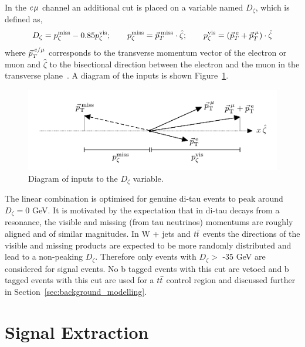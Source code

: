 In the $e_{}\mu_{}$ channel an additional cut is placed on a variable named $D_{\zeta}$, which is defined as,
\begin{equation}
D_\zeta = p_\zeta^\text{miss} - 0.85 p_\zeta^\text{vis};\qquad
p_\zeta^\text{miss} = \vec{p}_{T}^{\hspace{2pt}\text{miss}} \cdot \hat{\zeta};\qquad
p_\zeta^\text{vis} = (\vec{p}_{T}^{\hspace{2pt}e} + \vec{p}_{T}^{\hspace{2pt}\mu}) \cdot \hat{\zeta}
\label{eq:Dzeta_def}
\end{equation}
where $\vec{p}_{T}^{\hspace{2pt}e/\mu}$ corresponds to the transverse momentum vector of the electron or muon and $\hat{\zeta}$ to the bisectional direction between the electron and the muon in the transverse plane~\cite{CDFPzeta}.
A diagram of the inputs is shown Figure~\ref{fig:dzeta_diagram}.
\begin{figure}[!hbtp]
\centering
    \includegraphics[width=1.0\textwidth]{Figures/dzeta_diagram.pdf}
\caption{Diagram of inputs to the $D_\zeta$ variable.}
\label{fig:dzeta_diagram}
\end{figure}
The linear combination is optimised for genuine di-tau events to peak around $D_{\zeta} = 0$ GeV. 
It is motivated by the expectation that in di-tau decays from a resonance, the visible and missing (from tau neutrinos) momentums are roughly aligned and of similar magnitudes.
In W + jets and $t\bar{t}$ events the directions of the visible and missing products are expected to be more randomly distributed and lead to a non-peaking $D_{\zeta}$.
Therefore only events with $D_\zeta >$ -35 GeV are considered for signal events.
No b tagged events with this cut are vetoed and b tagged events with this cut are used for a $t\bar{t}$ control region and discussed further in Section~\ref{sec:background_modelling}.

\section{Signal Extraction}

